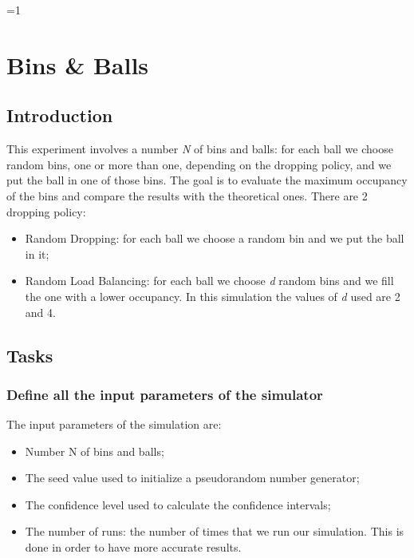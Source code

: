 \documentclass{report}
\newcounter{debug}
\begin{document}
\ifnum\value{debug}=1 {
    
\chapter{Bins \& Balls}
	 
	\section{Introduction}
	 
	This experiment involves a number \emph{N} of bins and balls: for each ball we choose random bins, one or more than one, depending on the dropping policy, and we put the ball in one of those bins. The goal is to evaluate the maximum occupancy of the bins and compare the results with the theoretical ones. There are 2 dropping policy:
	\begin{itemize}
		\item Random Dropping: for each ball we choose a random bin and we put the ball in it; 
		\item Random Load Balancing: for each ball we choose \emph{d} random bins and we fill the one with a lower occupancy. In this simulation the values of \emph{d} used are 2 and 4.
	\end{itemize}

	\section{Tasks}
	 
		\subsection{Define all the input parameters of the simulator}
			The input parameters of the simulation are:
			\begin{itemize}
				\item Number N of bins and balls;
				\item The seed value used to initialize a pseudorandom number generator;
				\item The confidence level used to calculate the confidence intervals;
				\item The number of runs: the number of times that we run our simulation. This is done in order to have more accurate results.
			\end{itemize}
			 
}
\end{document}
